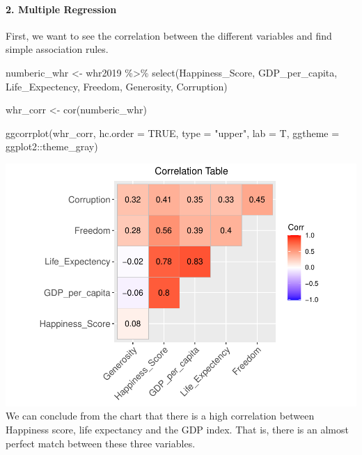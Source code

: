 \documentclass[
]{article}
\newenvironment{Shaded}{\begin{snugshade}}{\end{snugshade}}
\newcommand{\AttributeTok}[1]{\textcolor[rgb]{0.77,0.63,0.00}{#1}}
\newcommand{\ConstantTok}[1]{\textcolor[rgb]{0.00,0.00,0.00}{#1}}
\newcommand{\FunctionTok}[1]{\textcolor[rgb]{0.00,0.00,0.00}{#1}}
\newcommand{\NormalTok}[1]{#1}
\newcommand{\OtherTok}[1]{\textcolor[rgb]{0.56,0.35,0.01}{#1}}
\newcommand{\SpecialCharTok}[1]{\textcolor[rgb]{0.00,0.00,0.00}{#1}}
\newcommand{\StringTok}[1]{\textcolor[rgb]{0.31,0.60,0.02}{#1}}
\begin{document}
\hfill\break

\hypertarget{multiple-regression}{%
\paragraph{2. Multiple Regression}\label{multiple-regression}}

First, we want to see the correlation between the different variables
and find simple association rules.

\begin{Shaded}
\begin{Highlighting}[]
\NormalTok{numberic\_whr }\OtherTok{\textless{}{-}}\NormalTok{ whr2019 }\SpecialCharTok{\%\textgreater{}\%}
  \FunctionTok{select}\NormalTok{(Happiness\_Score, GDP\_per\_capita, Life\_Expectency, Freedom, Generosity, Corruption)}

\NormalTok{whr\_corr }\OtherTok{\textless{}{-}} \FunctionTok{cor}\NormalTok{(numberic\_whr)}

\FunctionTok{ggcorrplot}\NormalTok{(whr\_corr, }\AttributeTok{hc.order =} \ConstantTok{TRUE}\NormalTok{, }\AttributeTok{type =} \StringTok{"upper"}\NormalTok{, }\AttributeTok{lab =}\NormalTok{ T,}
           \AttributeTok{ggtheme =}\NormalTok{ ggplot2}\SpecialCharTok{::}\NormalTok{theme\_gray)}
\end{Highlighting}
\end{Shaded}

\includegraphics{World-Happiness_files/figure-latex/unnamed-chunk-9-1.pdf}\\

We can conclude from the chart that there is a high correlation between
Happiness score, life expectancy and the GDP index. That is, there is an
almost perfect match between these three variables.
\end{document}
